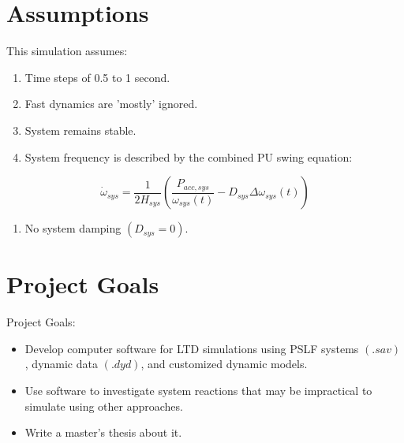 \documentclass[14pt, unknownkeysallowed]{beamer}
\newcounter{assumptions}
\begin{document}
\section{Assumptions}
\begin{frame}
This simulation assumes:
\begin{enumerate}
	\item Time steps of 0.5 to 1 second.
	\item Fast dynamics are 'mostly' ignored.
	\item System remains stable.
	\item System frequency is described by the combined PU swing equation:
	\setcounter{assumptions}{\value{enumi}} %
\end{enumerate}
	\[ \dot{\omega}_{sys} = \dfrac{1}{2H_{sys} } \left( \dfrac{P_{acc, sys} }{\omega_{sys}(t)} - D_{sys}\Delta\omega_{sys}(t)  \right)\] 
\begin{enumerate}
	\setcounter{enumi}{\value{assumptions}}
		\item No system damping $(D_{sys} = 0)$.	
\end{enumerate}
\end{frame}
\section{Project Goals}
\begin{frame}
Project Goals:
\begin{itemize}
	\item Develop computer software for LTD simulations using PSLF systems $(.sav)$, dynamic data $(.dyd)$, and customized dynamic models.
	\item Use software to investigate system reactions that may be impractical to simulate using other approaches.
	\item Write a master's thesis about it.
\end{itemize}

\end{frame}

\end{document}
